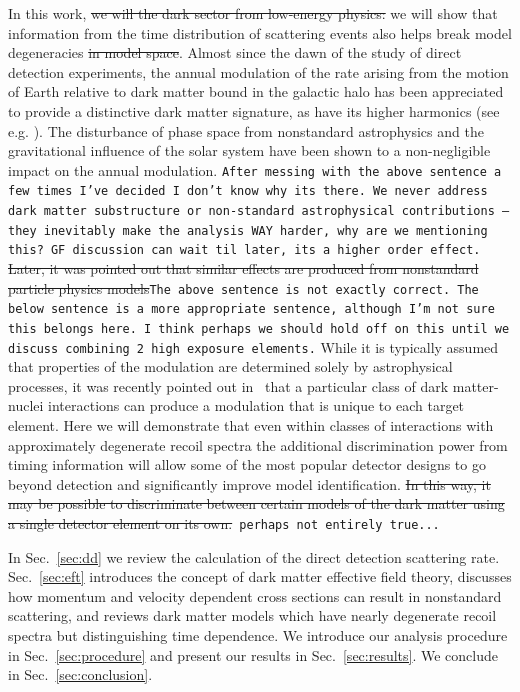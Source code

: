 \documentclass[11pt]{article}
\newcommand{\Sec}[1]{Sec.~\ref{#1}} \newcommand{\Secs}[2]{Secs.~\ref{#1} and \ref{#2}} \newcommand{\Secm}[2]{Secs.~\ref{#1} through \ref{#2}}
\newcommand{\sjwColor}{red}
\newcommand{\sjw}[1]{{\color{\sjwColor} #1}}
\newcommand{\sjwrm}[1]{{\color{\sjwColor}\protect\sout{#1}}}
\newcommand{\sjwtt}[1]{{\color{\sjwColor}\tt #1}}
\begin{document}
In this work, \sjwrm{we will the dark sector from low-energy physics:} we will show that information from the time distribution of scattering events also helps break \sjw{model} degeneracies \sjwrm{in model space}. Almost since the dawn of the study of direct detection experiments, the annual modulation of the rate \cite{Freese:1987wu} arising from the motion of Earth relative to dark matter bound in the galactic halo has been appreciated to provide a distinctive dark matter signature, as have its higher harmonics (see e.g. \cite{Freese:2012xd,Lee:2013xxa,Britto:2014wga,DelNobile:2015nua,Kouvaris:2015xga}). \sjw{ The disturbance of phase space from nonstandard astrophysics \cite{Green:2000ga,Gelmini:2000dm,DelNobile:2015nua} and the gravitational influence of the solar system \cite{Lee:2013wza,DelNobile:2015nua} have been shown to a non-negligible impact on the annual modulation. }\sjwtt{After messing with the above sentence a few times I've decided I don't know why its there. We never address dark matter substructure or non-standard astrophysical contributions -- they inevitably make the analysis WAY harder, why are we mentioning this? GF discussion can wait til later, its a higher order effect.} \sjwrm{Later, it was pointed out that similar effects are produced from nonstandard particle physics models}\sjwtt{The above sentence is not exactly correct. The below sentence is a more appropriate sentence, although I'm not sure this belongs here. I think perhaps we should hold off on this until we discuss combining 2 high exposure elements.}\sjw{While it is typically assumed that properties of the modulation are determined solely by astrophysical processes, it was recently pointed out in~\cite{DelNobile:2015tza,DelNobile:2015rmp} that a particular class of dark matter-nuclei interactions can produce a modulation that is unique to each target element}. Here we will demonstrate that even within classes of interactions with approximately degenerate recoil spectra the additional discrimination power from timing information will allow some of the most popular detector designs to go beyond detection and significantly improve model identification. \sjwrm{In this way, it may be possible to discriminate between certain models of the dark matter using a single detector element on its own.}\sjwtt{ perhaps not entirely true...}


In \Sec{sec:dd} we review the calculation of the direct detection scattering rate. \Sec{sec:eft} introduces the concept of dark matter effective field theory, discusses how momentum and velocity dependent cross sections can result in nonstandard scattering, and reviews dark matter models which have nearly degenerate recoil spectra but distinguishing time dependence. We introduce our analysis procedure in \Sec{sec:procedure} and present our results in \Sec{sec:results}. We conclude in \Sec{sec:conclusion}.
  
\end{document}
